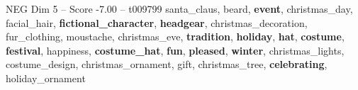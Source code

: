 \begin{textsample}{NEG Dim 5 – Score -7.00 – t009799}  \label{ex:f5_neg_012}
santa\_claus, beard, \textbf{event}, christmas\_day, facial\_hair, \textbf{fictional\_character}, \textbf{headgear}, christmas\_decoration, fur\_clothing, moustache, christmas\_eve, \textbf{tradition}, \textbf{holiday}, \textbf{hat}, \textbf{costume}, \textbf{festival}, happiness, \textbf{costume\_hat}, \textbf{fun}, \textbf{pleased}, \textbf{winter}, christmas\_lights, costume\_design, christmas\_ornament, gift, christmas\_tree, \textbf{celebrating}, holiday\_ornament

\end{textsample}
